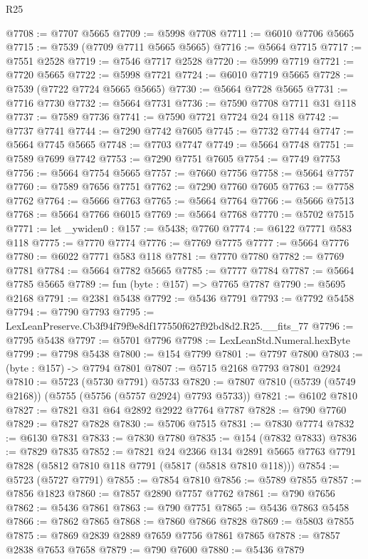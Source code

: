\begin{lexlean}{R25}
\begin{coremodule}
@7708 := @7707 @5665
@7709 := @5998 @7708
@7711 := @6010 @7706 @5665
@7715 := @7539 (@7709 @7711 @5665 @5665)
@7716 := @5664 @7715
@7717 := @7551 @2528
@7719 := @7546 @7717 @2528
@7720 := @5999 @7719
@7721 := @7720 @5665
@7722 := @5998 @7721
@7724 := @6010 @7719 @5665
@7728 := @7539 (@7722 @7724 @5665 @5665)
@7730 := @5664 @7728 @5665
@7731 := @7716 @7730
@7732 := @5664 @7731
@7736 := @7590 @7708 @7711 @31 @118
@7737 := @7589 @7736
@7741 := @7590 @7721 @7724 @24 @118
@7742 := @7737 @7741
@7744 := @7290 @7742 @7605
@7745 := @7732 @7744
@7747 := @5664 @7745 @5665
@7748 := @7703 @7747
@7749 := @5664 @7748
@7751 := @7589 @7699 @7742
@7753 := @7290 @7751 @7605
@7754 := @7749 @7753
@7756 := @5664 @7754 @5665
@7757 := @7660 @7756
@7758 := @5664 @7757
@7760 := @7589 @7656 @7751
@7762 := @7290 @7760 @7605
@7763 := @7758 @7762
@7764 := @5666 @7763
@7765 := @5664 @7764
@7766 := @5666 @7513
@7768 := @5664 @7766 @6015
@7769 := @5664 @7768
@7770 := @5702 @7515
@7771 := let _ywiden0 : @157 := @5438; @7760
@7774 := @6122 @7771 @583 @118
@7775 := @7770 @7774
@7776 := @7769 @7775
@7777 := @5664 @7776
@7780 := @6022 @7771 @583 @118
@7781 := @7770 @7780
@7782 := @7769 @7781
@7784 := @5664 @7782 @5665
@7785 := @7777 @7784
@7787 := @5664 @7785 @5665
@7789 := fun (byte : @157) => @7765 @7787
@7790 := @5695 @2168
@7791 := @2381 @5438
@7792 := @5436 @7791
@7793 := @7792 @5458
@7794 := @7790 @7793
@7795 := LexLeanPreserve.Cb3f94f79f9e8df177550f627f92bd8d2.R25.__fits_77
@7796 := @7795 @5438
@7797 := @5701 @7796
@7798 := LexLeanStd.Numeral.hexByte
@7799 := @7798 @5438
@7800 := @154 @7799
@7801 := @7797 @7800
@7803 := (byte : @157) -> @7794 @7801
@7807 := @5715 @2168 @7793 @7801 @2924
@7810 := @5723 (@5730 @7791) @5733
@7820 := @7807 @7810 (@5739 (@5749 @2168)) (@5755 (@5756 (@5757 @2924) @7793 @5733))
@7821 := @6102 @7810
@7827 := @7821 @31 @64 @2892 @2922 @7764 @7787
@7828 := @790 @7760
@7829 := @7827 @7828
@7830 := @5706 @7515
@7831 := @7830 @7774
@7832 := @6130 @7831
@7833 := @7830 @7780
@7835 := @154 (@7832 @7833)
@7836 := @7829 @7835
@7852 := @7821
    @24
    @2366
    @134
    @2891
    @5665
    @7763
    @7791
    @7828
    (@5812 @7810 @118 @7791 (@5817 (@5818 @7810 @118)))
@7854 := @5723 (@5727 @7791)
@7855 := @7854 @7810
@7856 := @5789 @7855
@7857 := @7856 @1823
@7860 := @7857 @2890 @7757 @7762
@7861 := @790 @7656
@7862 := @5436 @7861
@7863 := @790 @7751
@7865 := @5436 @7863 @5458
@7866 := @7862 @7865
@7868 := @7860 @7866 @7828
@7869 := @5803 @7855
@7875 := @7869 @2839 @2889 @7659 @7756 @7861 @7865
@7878 := @7857 @2838 @7653 @7658
@7879 := @790 @7600
@7880 := @5436 @7879

\end{coremodule}
\end{lexlean}
